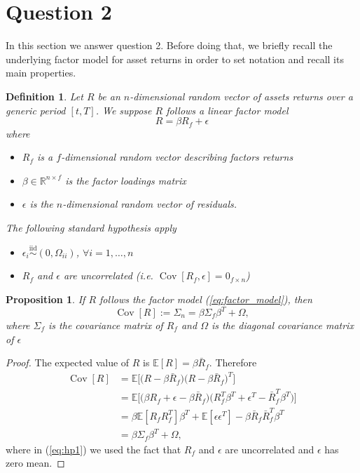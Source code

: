 \documentclass[12pt, a4paper]{article}
\theoremstyle{problemstyle}
\newtheorem{definition}{Definition}[section]
\newtheorem{proposition}{Proposition}[section]
\newcommand{\Cov}[1]{\operatorname{Cov}\left[#1\right]}
\begin{document}
\section{Question 2}
In this section we answer question 2. Before doing that, we briefly recall the underlying factor model for asset returns in order to set notation and recall its main properties.

\begin{definition}
	Let $R$ be an $n$-dimensional random vector of assets returns over a generic period $[t, T]$. We suppose $R$ follows a linear factor model 
	\begin{equation}\label{eq:factor_model}
	R = \beta R_f + \epsilon
	\end{equation}
	where
	\begin{itemize}
		\item $R_f$ is a $f$-dimensional random vector describing factors returns
		\item $\beta \in \mathbb{R}^{n \times f}$ is the factor loadings matrix
		\item $\epsilon$ is the $n$-dimensional random vector of residuals.
	\end{itemize}
The following standard hypothesis apply
\begin{itemize}
	\item $\epsilon_i \overset{\mathrm{iid}}{\sim} (0, \Omega_{ii})$, $\forall i = 1, \ldots, n$
	\item $R_f$ and $\epsilon$ are uncorrelated (i.e. $\Cov{R_f, \epsilon}=0_{f\times n}$)
\end{itemize}
\end{definition}

\begin{proposition}
	If $R$ follows the factor model (\ref{eq:factor_model}), then 
	\begin{equation}
	\Cov{R}:=\Sigma_n=\beta\Sigma_f \beta^T + \Omega,
	\end{equation}
	where $\Sigma_f$ is the covariance matrix of $R_f$ and $\Omega$ is the diagonal covariance matrix of $\epsilon$
\end{proposition}
\begin{proof}
	The expected value of $R$ is $\mathbb{E}[R]=\beta \bar{R}_f$. Therefore
	\begin{align}
	\Cov{R} & = \mathbb{E}\Bigg[\Big(R - \beta \bar{R}_f\Big)\Big(R - \beta \bar{R}_f\Big)^T\Bigg] \\
	& = \mathbb{E}\Bigg[\Big(\beta R_f + \epsilon -  \beta \bar{R}_f\Big)\Big(R_f^T\beta^T + \epsilon^T - \bar{R}_f^T\beta^T\Big)\Bigg]\\ \label{eq:hp1}
	& = \beta\mathbb{E}[R_fR_f^T]\beta^T + \mathbb{E}[\epsilon \epsilon^T] - \beta\bar{R}_f\bar{R}_f^T\beta^T\\ \label{eq:hp2}
	& = \beta\Sigma_f \beta^T + \Omega,
	\end{align}
	where in (\ref{eq:hp1}) we used the fact that $R_f$ and $\epsilon$ are uncorrelated and $\epsilon$ has zero mean.
\end{proof}
\end{document}
